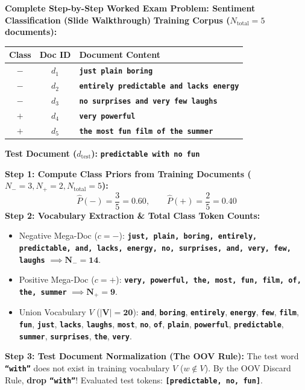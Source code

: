 \documentclass[10pt,a4paper]{article}
\newcommand{\rx}[1]{\texttt{\bfseries\color{inlinecode}#1}}
\begin{document}
\begin{examplebox}
\footnotesize
\textbf{Complete Step-by-Step Worked Exam Problem: Sentiment Classification (Slide Walkthrough)}
\newline \textbf{Training Corpus ($N_{\text{total}} = 5$ documents):}
\begin{center}
\renewcommand{\arraystretch}{1.03}
\begin{tabular}{ccl}
\toprule
\rowcolor{lightbg}
\textbf{Class} & \textbf{Doc ID} & \textbf{Document Content} \\
\midrule
$-$ & $d_1$ & \rx{just plain boring} \\
$-$ & $d_2$ & \rx{entirely predictable and lacks energy} \\
$-$ & $d_3$ & \rx{no surprises and very few laughs} \\
\midrule
$+$ & $d_4$ & \rx{very powerful} \\
$+$ & $d_5$ & \rx{the most fun film of the summer} \\
\bottomrule
\end{tabular}
\end{center}
\textbf{Test Document ($d_{\text{test}}$):} \quad \rx{predictable with no fun}

\vspace{1pt}
\textbf{Step 1: Compute Class Priors from Training Documents ($N_- = 3, N_+ = 2, N_{\text{total}} = 5$):}
\[
\hat{P}(-) = \frac{3}{5} = 0.60, \qquad \hat{P}(+) = \frac{2}{5} = 0.40
\]
\textbf{Step 2: Vocabulary Extraction \& Total Class Token Counts:}
\begin{itemize}[leftmargin=12pt, itemsep=0.5pt, parsep=0pt]
    \item Negative Mega-Doc ($c=-$): \rx{just, plain, boring, entirely, predictable, and, lacks, energy, no, surprises, and, very, few, laughs} $\implies \mathbf{N_- = 14}$.
    \item Positive Mega-Doc ($c=+$): \rx{very, powerful, the, most, fun, film, of, the, summer} $\implies \mathbf{N_+ = 9}$.
    \item Union Vocabulary $V$ ($\mathbf{|V| = 20}$): \rx{and}, \rx{boring}, \rx{entirely}, \rx{energy}, \rx{few}, \rx{film}, \rx{fun}, \rx{just}, \rx{lacks}, \rx{laughs}, \rx{most}, \rx{no}, \rx{of}, \rx{plain}, \rx{powerful}, \rx{predictable}, \rx{summer}, \rx{surprises}, \rx{the}, \rx{very}.
\end{itemize}
\textbf{Step 3: Test Document Normalization (The OOV Rule):}
\newline The test word \rx{``with''} does not exist in training vocabulary $V$ ($w \notin V$). By the OOV Discard Rule, \textbf{drop \rx{``with''}}!
\newline Evaluated test tokens: \rx{[predictable, no, fun]}.


\end{examplebox}
\end{document}
